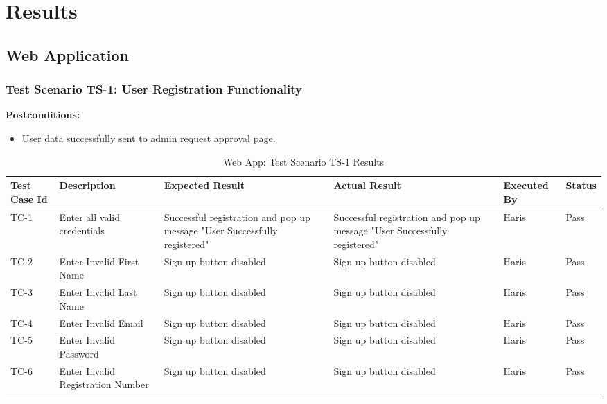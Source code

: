 
\chapter{Results} %
\label{Chapter6}

\section{Web Application}
\subsection{Test Scenario TS-1: User Registration Functionality}
\textbf{Postconditions:}
\begin{itemize}

\item User data successfully sent to admin request approval page.

\end{itemize}

\bigskip

\begin{longtable}{|p{1cm}|p{3cm}|p{2cm}|p{2cm}|p{2cm}|p{2cm}|}
\hline
\textbf{Test Case Id} & \textbf{Description} & \textbf{Expected Result} & \textbf{Actual Result} & \textbf{Executed By} & \textbf{Status}\\
\hline
TC-1 &
Enter all valid credentials &
Successful registration and pop up message "User Successfully registered" &
Successful registration and pop up message "User Successfully registered" &
Haris &
Pass \\
\hline


TC-2 &
Enter Invalid First Name &
Sign up button disabled &
Sign up button disabled &
Haris &
Pass \\
\hline

TC-3 &
Enter Invalid Last Name &
Sign up button disabled &
Sign up button disabled &
Haris &
Pass \\
\hline

TC-4 &
Enter Invalid Email &
Sign up button disabled &
Sign up button disabled &
Haris &
Pass \\
\hline

TC-5 &
Enter Invalid Password &
Sign up button disabled &
Sign up button disabled &
Haris &
Pass \\
\hline

TC-6 &
Enter Invalid Registration Number &
Sign up button disabled &
Sign up button disabled &
Haris &
Pass \\
\hline



\caption{Web App: Test Scenario TS-1 Results}
\end{longtable}




